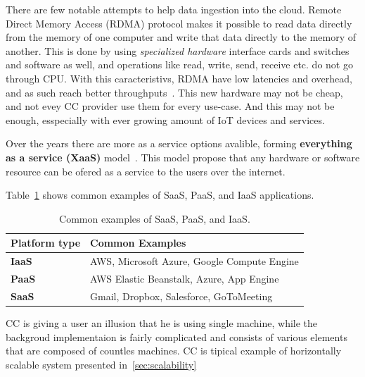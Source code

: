 There are few notable attempts to help data ingestion into the cloud. Remote Direct Memory Access (RDMA) protocol makes it possible to read data directly from the memory of one computer and write that data directly to the memory of another. This is done by using \textit{specialized hardware} interface cards and switches and software as well, and operations like read, write, send, receive etc. do not go through CPU. With this caracteristivs, RDMA have low latencies and overhead, and as such reach better throughputs~\cite{CohenTKCKRCDG09}. This new hardware may not be cheap, and not evey CC provider use them for every use-case. And this may not be enough, esspecially with ever growing amount of IoT devices and services.

Over the years there are more as a service options avalible, forming \textbf{everything as a service (XaaS)} model~\cite{DuanFZSNH15}. This model propose that any hardware or software resource can be ofered as a service to the users over the internet.

Table~\ref{tab:table2} shows common examples of SaaS, PaaS, and IaaS applications.

\begin{table}[h!]
	\begin{center}
		\begin{tabular}{l|l}
			\textbf{Platform type} & \textbf{Common Examples}\\
			\hline
			\textbf{IaaS} & AWS, Microsoft Azure, Google Compute Engine \\
			\textbf{PaaS} & AWS Elastic Beanstalk, Azure, App Engine \\
			\textbf{SaaS} & Gmail, Dropbox, Salesforce, GoToMeeting \\
		\end{tabular}
	\end{center}
	\vspace{-0.5cm}
	\caption{Common examples of SaaS, PaaS, and IaaS.}
	\label{tab:table2}
\end{table}

CC is giving a user an illusion that he is using single machine, while the backgroud implementaion is fairly complicated and consists of various elements that are composed of countles machines. CC is tipical example of horizontally scalable system presented in~\ref{sec:scalability}
%
%
